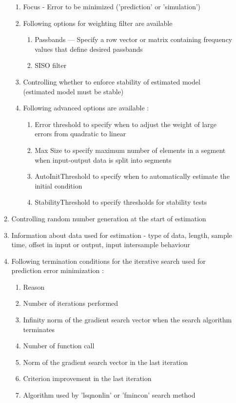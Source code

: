 \documentclass[a4paper,12pt]{report}
\begin{document}
\begin{enumerate}
\begin{enumerate}
\begin{enumerate}
				\item Focus - Error to be minimized ('prediction' or 'simulation')  
				\item Following options for weighting filter are available 
			\begin{enumerate}
				\item Passbands — Specify a row vector or matrix containing frequency values that define desired passbands
				\item SISO filter
			\end{enumerate}
				\item Controlling whether to enforce stability of estimated model (estimated model must be stable) 
				\item Following advanced options are available :
				\begin{enumerate}
					\item Error threshold to specify when to adjust the weight of large errors from quadratic to linear
					\item Max Size to specify maximum number of elements in a segment when input-output data is split into segments
					\item AutoInitThreshold to specify when to automatically estimate the initial condition
				\item	StabilityThreshold to specify thresholds for stability tests
					
	\end{enumerate}
\end{enumerate}
				
			\item Controlling random number generation at the start of estimation
			\item Information about data used for estimation - type of data, length, sample time, offset in input or output, input intersample behaviour 
			\item Following termination conditions for the iterative search used for prediction error minimization :
			\begin{enumerate}
				\item Reason
				\item Number of iterations performed
				\item Infinity norm of the gradient search vector when the search algorithm terminates
				\item Number of function call
				\item Norm of the gradient search vector in the last iteration
				\item Criterion improvement in the last iteration
				\item Algorithm used by 'lsqnonlin' or 'fmincon' search method
			\end{enumerate}
				

\end{enumerate}
\end{enumerate}
\end{document}

